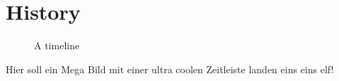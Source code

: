 \section{History}
\label{sec:History}

\begin{figure*}
    \caption{A timeline}
    \label{fig:timeline}
\end{figure*}

Hier soll ein Mega Bild mit einer ultra coolen Zeitleiste landen eins eins elf!